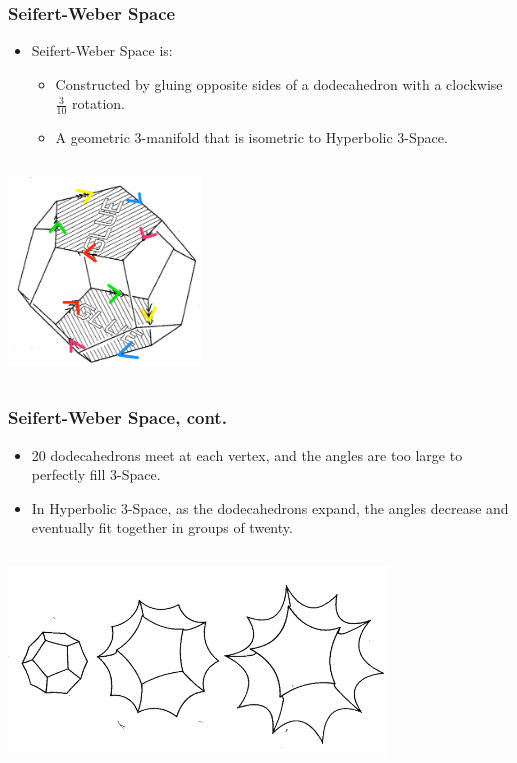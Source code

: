 \documentclass[13pt]{beamer}
\begin{document}
\begin{frame}
\frametitle{Seifert-Weber Space}
  \begin{itemize}
    \item \alert{Seifert-Weber Space} is:
          \begin{itemize}
             \item Constructed by gluing opposite sides of a dodecahedron with a clockwise $\frac{3}{10}$ rotation.
             \item A geometric 3-manifold that is isometric to Hyperbolic 3-Space.
           \end{itemize} 
  \end{itemize}

  \begin{columns}[c] %
     \centering
     \includegraphics[height=5cm]{./img/three_tenths}
  \end{columns}
\end{frame}

\begin{frame}
\frametitle{Seifert-Weber Space, cont.}
  \begin{itemize}
    \item 20 dodecahedrons meet at each vertex, and the angles are too large to perfectly fill 3-Space.
    \item In Hyperbolic 3-Space, as the dodecahedrons expand, the angles decrease and eventually fit together in groups of twenty.
  \end{itemize}

  \begin{columns}[c] %
     \centering
     \includegraphics[height=5cm]{./img/seifertspace}
  \end{columns}
\end{frame}
\end{document}

